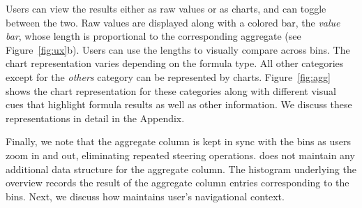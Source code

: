 Users can view the results
either as raw values or as charts, and can toggle between the two.
Raw values are displayed
along with a colored bar, the \emph{value bar},
whose length is proportional to
the corresponding aggregate (see Figure~\ref{fig:ux}b). Users can use the lengths to visually compare across bins.
The chart representation varies depending on the formula type.
All other categories except for the \emph{others} category
can be represented by charts.
Figure~\ref{fig:agg} shows the
chart representation for these categories
along with different visual cues
that highlight formula results
as well as other information. We discuss these representations 
in detail in the Appendix.


Finally, we note that the aggregate column
is kept in sync with the bins
as users zoom in and out,
eliminating repeated steering operations.
\noah does not maintain
any additional data structure for the aggregate column.
The histogram underlying the overview
records the result of the aggregate column entries
corresponding to the bins.
Next, we discuss how \noah maintains user's navigational context.

